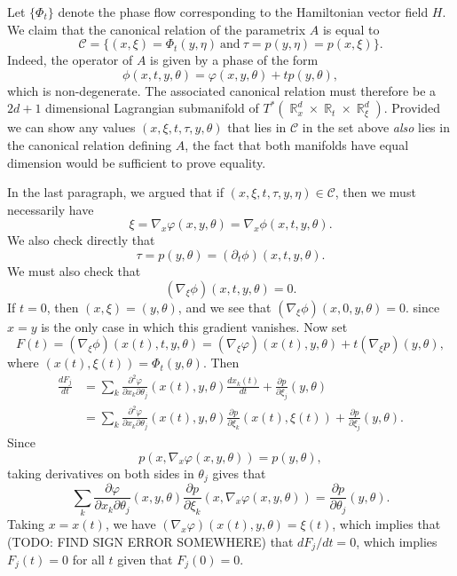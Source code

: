 \documentclass{article}
\theoremstyle{plain}
\theoremstyle{remark}
\theoremstyle{definition}
\DeclareMathOperator{\RR}{\mathbb{R}}
\begin{document}
Let $\{ \Phi_t \}$ denote the phase flow corresponding to the Hamiltonian vector field $H$. We claim that the canonical relation of the parametrix $A$ is equal to
%
\[ \mathcal{C} = \Big\{ (x,\xi) = \Phi_t(y, \eta)\ \text{and}\ \tau = p(y,\eta) = p(x,\xi) \Big\}. \]
%
Indeed, the operator of $A$ is given by a phase of the form
%
\[ \phi(x,t,y,\theta) = \varphi(x,y,\theta) + t p(y,\theta), \]
%
which is non-degenerate. The associated canonical relation must therefore be a $2d + 1$ dimensional Lagrangian submanifold of $T^*(\RR^d_x \times \RR_t \times \RR^d_\xi)$. Provided we can show any values $(x,\xi,t,\tau,y,\theta)$ that lies in $\mathcal{C}$ in the set above \emph{also} lies in the canonical relation defining $A$, the fact that both manifolds have equal dimension would be sufficient to prove equality.

In the last paragraph, we argued that if $(x,\xi,t,\tau,y,\eta) \in \mathcal{C}$, then we must necessarily have
%
\[ \xi = \nabla_x \varphi(x,y,\theta) = \nabla_x \phi(x,t,y,\theta). \]
%
We also check directly that
%
\[ \tau = p(y,\theta) = (\partial_t \phi)(x,t,y,\theta). \]
%
We must also check that
%
\[ (\nabla_\xi \phi)(x,t,y,\theta) = 0. \]
%
If $t = 0$, then $(x,\xi) = (y,\theta)$, and we see that $(\nabla_\xi \phi)(x,0,y,\theta) = 0$. since $x = y$ is the only case in which this gradient vanishes. Now set
%
\[ F(t) = (\nabla_\xi \phi)( x(t), t, y, \theta ) = (\nabla_\xi \varphi)(x(t), y, \theta) + t (\nabla_\xi p)(y,\theta), \]
%
where $(x(t), \xi(t)) = \Phi_t(y,\theta)$. Then
%
\begin{align*}
	\frac{dF_j}{dt} &= \sum_k \frac{\partial^2 \varphi}{\partial x_k \partial \theta_j}(x(t), y, \theta) \frac{dx_k(t)}{dt} + \frac{\partial p}{\partial \xi_j}(y,\theta)\\
	&= \sum_k \frac{\partial^2 \varphi}{\partial x_k \partial \theta_j}(x(t), y, \theta) \frac{\partial p}{\partial \xi_k}(x(t), \xi(t)) + \frac{\partial p}{\partial \xi_j}(y,\theta).
\end{align*}
%
Since
%
\[ p(x, \nabla_x \varphi(x,y,\theta)) = p(y, \theta), \]
%
taking derivatives on both sides in $\theta_j$ gives that
%
\[ \sum_k \frac{\partial \varphi}{\partial x_k \partial \theta_j}(x,y,\theta) \frac{\partial p}{\partial \xi_k}(x, \nabla_x \varphi(x,y,\theta)) = \frac{\partial p}{\partial \theta_j}(y,\theta). \]
%
Taking $x = x(t)$, we have $(\nabla_x \varphi)(x(t), y,\theta) = \xi(t)$, which implies that (TODO: FIND SIGN ERROR SOMEWHERE) that $dF_j / dt = 0$, which implies $F_j(t) = 0$ for all $t$ given that $F_j(0) = 0$.
\end{document}
